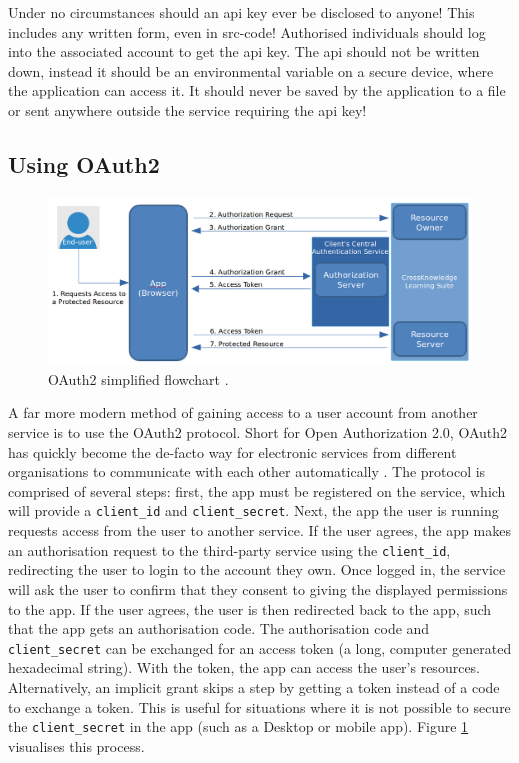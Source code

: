 \documentclass[11pt]{article}
\begin{document}
\begin{warn}
Under no circumstances should an \acrshort{api} key ever be disclosed to anyone! This includes any written form, even in \gls{src-code}! Authorised individuals should log into the associated account to get the \acrshort{api} key. The \acrshort{api} should not be written down, instead it should be an environmental variable on a secure device, where the application can access it. It should never be saved by the application to a file or sent anywhere outside the service requiring the \acrshort{api} key!
\end{warn}

\subsection{Using OAuth2}

\begin{figure}[b!]
    \centering
    \includegraphics[width=\textwidth]{figures/oauth2workflow.png}
    \caption{OAuth2 simplified flowchart \cite{oauth2-fig}.}
    \label{fig:oauth-flowchart}
\end{figure}

A far more modern method of gaining access to a \gls{user} account from another service is to use the OAuth2 protocol. Short for Open Authorization 2.0, OAuth2 has quickly become the de-facto way for electronic services from different organisations to communicate with each other automatically \cite{oauth2}. The protocol is comprised of several steps: first, the app must be registered on the service, which will provide a \texttt{client\_id} and \texttt{client\_secret}. Next, the app the user is running \gls{request}s access from the user to another service. If the user agrees, the app makes an authorisation \gls{request} to the third-party service using the \texttt{client\_id}, redirecting the user to login to the account they own. Once logged in, the service will ask the user to confirm that they consent to giving the displayed permissions to the app. If the user agrees, the user is then redirected back to the app, such that the app gets an authorisation code. The authorisation code and \texttt{client\_secret} can be exchanged for an access \gls{token} (a long, computer generated hexadecimal string). With the \gls{token}, the app can access the user's resources. Alternatively, an implicit grant skips a step by getting a \gls{token} instead of a code to exchange a \gls{token}. This is useful for situations where it is not possible to secure the \texttt{client\_secret} in the app (such as a Desktop or mobile app). Figure \ref{fig:oauth-flowchart} visualises this process.
\end{document}
